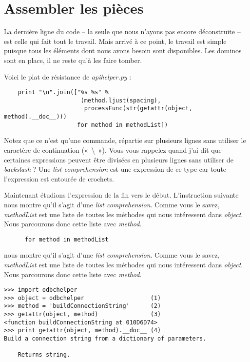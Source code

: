 \section{Assembler les pièces}

La dernière ligne du code -- la seule que nous n’ayons pas encore déconstruite -- est celle qui fait tout le travail. Mais arrivé à ce point, le travail est simple puisque tous les éléments dont nous avons besoin sont disponibles. Les dominos sont en place, il ne reste qu’à les faire tomber.

\medskip
\noindent Voici le plat de résistance de \emph{apihelper.py} :

\begin{lstlisting}
    print "\n".join(["%s %s" %
                      (method.ljust(spacing),
                       processFunc(str(getattr(object, method).__doc__)))
                     for method in methodList])
\end{lstlisting}

Notez que ce n’est qu’une commande, répartie sur plusieurs lignes sans utiliser le caractère de continuation («~\textbackslash~»). Vous vous rappelez quand j’ai dit que certaines expressions peuvent être divisées en plusieurs lignes sans utiliser de \emph{backslash} ? Une \emph{list comprehension} est une expression de ce type car toute l’expression est entourée de crochets.

\medskip
Maintenant étudions l’expression de la fin vers le début. L'instruction suivante nous montre qu’il s’agit d’une \emph{list comprehension}. Comme vous le savez, \emph{methodList} est une liste de toutes les méthodes qui nous intéressent dans \emph{object}. Nous parcourons donc cette liste avec \emph{method}.

\begin{lstlisting}
      for method in methodList
\end{lstlisting}

\noindent nous montre qu’il s’agit d’une \emph{list comprehension}. Comme vous le savez, \emph{methodList} est une liste de toutes les méthodes qui nous intéressent dans \emph{object}. Nous parcourons donc cette liste avec \emph{method}.

\begin{example}
\begin{lstlisting}
>>> import odbchelper
>>> object = odbchelper                   (1)
>>> method = 'buildConnectionString'      (2)
>>> getattr(object, method)               (3)
<function buildConnectionString at 010D6D74>
>>> print getattr(object, method).__doc__ (4)
Build a connection string from a dictionary of parameters.

    Returns string.
\end{lstlisting}
\end{example}

